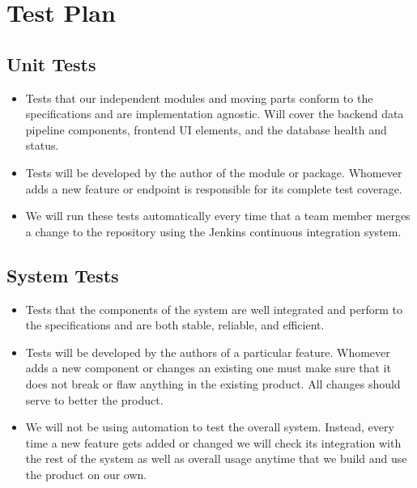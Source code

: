 \documentclass[11pt]{article}
\begin{document}
\section{Test Plan}

\subsection{Unit Tests}
\begin{itemize}
    \item Tests that our independent modules and moving parts conform to the specifications and are implementation agnostic. Will cover the backend data pipeline components, frontend UI elements, and the database health and status.
    \item Tests will be developed by the author of the module or package. Whomever adds a new feature or endpoint is responsible for its complete test coverage.
    \item We will run these tests automatically every time that a team member merges a change to the repository using the Jenkins continuous integration system.
\end{itemize}

\subsection{System Tests}
\begin{itemize}
    \item Tests that the components of the system are well integrated and perform to the specifications and are both stable, reliable, and efficient.
    \item Tests will be developed by the authors of a particular feature. Whomever adds a new component or changes an existing one must make sure that it does not break or flaw anything in the existing product. All changes should serve to better the product.
    \item We will not be using automation to test the overall system. Instead, every time a new feature gets added or changed we will check its integration with the rest of the system as well as overall usage anytime that we build and use the product on our own.
\end{itemize}
\end{document}
